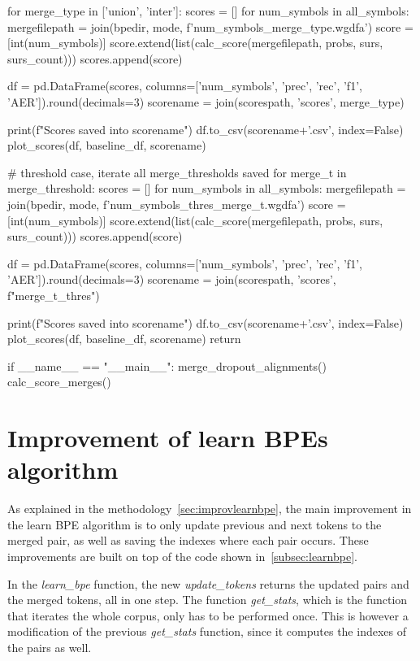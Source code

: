 \begin{python}
  for merge_type in ['union', 'inter']:
    scores = []
    for num_symbols in all_symbols:
      mergefilepath = join(bpedir, mode, f'{num_symbols}_{merge_type}.wgdfa')
      score = [int(num_symbols)]
      score.extend(list(calc_score(mergefilepath, probs, surs, surs_count)))
      scores.append(score)

    df = pd.DataFrame(scores, columns=['num_symbols', 'prec', 'rec', 'f1', 'AER']).round(decimals=3)
    scorename = join(scorespath, 'scores', merge_type)

    print(f"Scores saved into {scorename}")
    df.to_csv(scorename+'.csv', index=False)
    plot_scores(df, baseline_df, scorename)

  # threshold case, iterate all merge_thresholds saved
  for merge_t in merge_threshold:
    scores = []
    for num_symbols in all_symbols:
      mergefilepath = join(bpedir, mode, f'{num_symbols}_thres_{merge_t}.wgdfa')
      score = [int(num_symbols)]
      score.extend(list(calc_score(mergefilepath, probs, surs, surs_count)))
      scores.append(score)

    df = pd.DataFrame(scores, columns=['num_symbols', 'prec', 'rec', 'f1', 'AER']).round(decimals=3)
    scorename = join(scorespath, 'scores', f"{merge_t}_thres")
    
    print(f"Scores saved into {scorename}")
    df.to_csv(scorename+'.csv', index=False)
    plot_scores(df, baseline_df, scorename)
  return

if __name__ == "__main__":
    merge_dropout_alignments()
    calc_score_merges()
\end{python}

\section{Improvement of learn BPEs algorithm}

As explained in the methodology~\ref{sec:improvlearnbpe}, the main improvement in the learn BPE algorithm is to only update previous and next tokens to the merged pair, as well as saving the indexes where each pair occurs. These improvements are built on top of the code shown in~\ref{subsec:learnbpe}. 

In the \emph{learn\_bpe} function, the new \emph{update\_tokens} returns the updated pairs and the merged tokens, all in one step. The function \emph{get\_stats}, which is the function that iterates the whole corpus, only has to be performed once. This is however a modification of the previous \emph{get\_stats} function, since it computes the indexes of the pairs as well.


